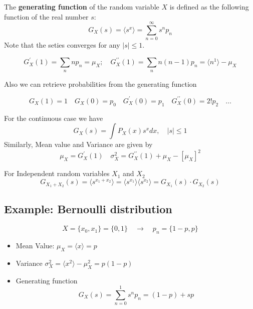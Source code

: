 The \textbf{generating function} of the random variable $X$ is defined as the following function of the real number $s$:
\begin{equation*}
    G_X(s) = \langle s^x \rangle = \sum_{n=0}^{\infty} s^n p_n
\end{equation*}
Note that the seties converges for any $|s| \leq 1$.

\begin{equation*}
    G^{\prime}_X (1) = \sum_n n p_n = \mu_X; \quad G^{\prime \prime}_X (1) = \sum_n n(n-1) p_n = \langle n^1 \rangle - \mu_X
\end{equation*}

\noindent
Also we can retrieve probabilities from the generating function

\begin{equation*}
    G_X(1) = 1 \quad G_X(0) = p_0 \quad G^{\prime}_X (0) = p_1 \quad G^{\prime \prime}_X(0) = 2!p_2 \quad \dots
\end{equation*}

For the continuous case we have
\begin{equation*}
    G_X(s) = \int P_X(x)s^x dx, \quad |s| \leq 1
\end{equation*}
Similarly, Mean value and Variance are given by
\begin{equation*}
    \mu_X = G^{\prime}_X(1) \quad \sigma_X^2 = G^{\prime \prime}_X(1) + \mu_X - [\mu_X]^2
\end{equation*}

For Independent random variables $X_1$ and $X_2$
\begin{equation*}
    G_{X_1+X_2}(s) = \langle s^{x_1 + x_2} \rangle = \langle s^{x_1} \rangle \langle s^{x_2} \rangle = G_{X_1}(s) \cdot G_{X_2} (s)
\end{equation*}

\subsection*{Example: Bernoulli distribution}
\begin{equation*}
    X=\{x_0, x_1 \} = \{0, 1\} \quad \rightarrow \quad p_n=\{ 1-p, p \}
\end{equation*}

\begin{itemize}
    \item Mean Value: $\mu_X = \langle x \rangle = p$
    \item Variance $\sigma^2_X = \langle x^2 \rangle - \mu^2_X = p (1-p) $
    \item Generating function
    \begin{equation*}
        G_X(s) = \sum_{n=0}^{1} s^n p_n = (1-p) + sp
    \end{equation*}
\end{itemize}


